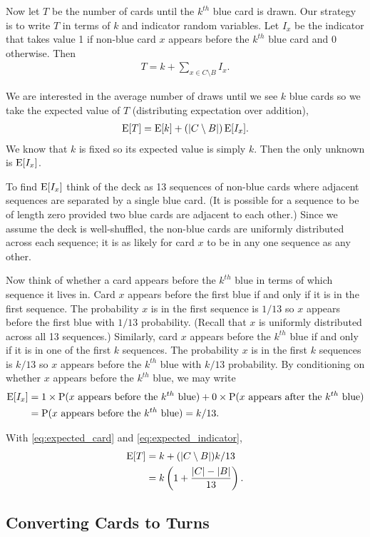 Now let $T$ be the number of cards until
the $k^{th}$ blue card is drawn.
Our strategy is to write $T$ in terms of $k$
and indicator random variables.
Let $I_x$ be the indicator that takes value 1
if non-blue card $x$ appears before the $k^{th}$ blue card
and 0 otherwise.
Then
\begin{align}
    T = k + \sum_{x \in C \setminus B} I_x. \nonumber
\end{align}

We are interested in the average number of draws
until we see $k$ blue cards
so we take the expected value of $T$
(distributing expectation over addition),
\begin{align} \label{eq:expected_card}
    \operatorname{\mathrm{E}}[T] = \operatorname{\mathrm{E}}[k] + (|C \setminus B|) \operatorname{\mathrm{E}}[I_x].
\end{align}
We know that $k$ is fixed so its expected value is simply $k$.
Then the only unknown is $\operatorname{\mathrm{E}}[I_x]$.

To find $\operatorname{\mathrm{E}}[I_x]$ think of the deck as 13 sequences 
of non-blue cards where adjacent sequences are
separated by a single blue card.
(It is possible for a sequence to be of length zero provided
two blue cards are adjacent to each other.)
Since we assume the deck is well-shuffled, the non-blue cards
are uniformly distributed across each sequence;
it is as likely for card $x$ to be in any one sequence
as any other.

Now think of whether a card appears before the $k^{th}$ blue
in terms of which sequence it lives in.
Card $x$ appears before the first blue if and only if it is 
in the first sequence.
The probability $x$ is in the first sequence is $1/13$
so $x$ appears before the first blue with $1/13$ probability.
(Recall that $x$ is uniformly distributed across all
13 sequences.)
Similarly, card $x$ appears before the $k^{th}$ blue if and only if
it is in one of the first $k$ sequences.
The probability $x$ is in the first $k$ sequences is $k/13$
so $x$ appears before the $k^{th}$ blue with $k/13$ probability.
By conditioning on whether $x$ appears before the $k^{th}$ blue,
we may write
\begin{align} \label{eq:expected_indicator}
    \operatorname{\mathrm{E}}[I_x] &= 1 \times 
    \operatorname{\mathrm{P}}(\textrm{$x$ appears before the $k^{th}$ blue}) +
    0 \times \operatorname{\mathrm{P}}(\textrm{$x$ appears after the $k^{th}$ blue})
    \nonumber \\
    &= \operatorname{\mathrm{P}}(\textrm{$x$ appears before the $k^{th}$ blue})
    = k/13.
\end{align}

With \cref{eq:expected_card} and \cref{eq:expected_indicator},
\begin{align}
    \operatorname{\mathrm{E}}[T] &= k + (|C \setminus B|) k/13 \nonumber \\
    &= k \left(1 + \frac{|C| - |B|}{13}\right). \nonumber
\end{align}

\subsection{Converting Cards to Turns}\label{sec:converting}